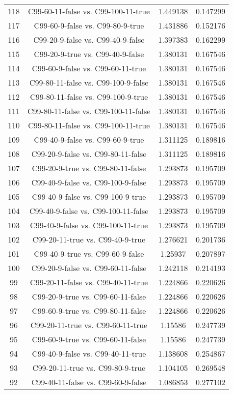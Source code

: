 \documentclass[a4paper,10pt]{article}
\begin{document}
\begin{landscape}
\begin{table}[!htp]
\begin{tabular}{cccc}
118&C99-60-11-false vs. C99-100-11-true&1.449138&0.147299\\
117&C99-60-9-false vs. C99-80-9-true&1.431886&0.152176\\
116&C99-20-9-false vs. C99-40-9-false&1.397383&0.162299\\
115&C99-20-9-true vs. C99-40-9-false&1.380131&0.167546\\
114&C99-60-9-false vs. C99-60-11-true&1.380131&0.167546\\
113&C99-80-11-false vs. C99-100-9-false&1.380131&0.167546\\
112&C99-80-11-false vs. C99-100-9-true&1.380131&0.167546\\
111&C99-80-11-false vs. C99-100-11-false&1.380131&0.167546\\
110&C99-80-11-false vs. C99-100-11-true&1.380131&0.167546\\
109&C99-40-9-false vs. C99-60-9-true&1.311125&0.189816\\
108&C99-20-9-false vs. C99-80-11-false&1.311125&0.189816\\
107&C99-20-9-true vs. C99-80-11-false&1.293873&0.195709\\
106&C99-40-9-false vs. C99-100-9-false&1.293873&0.195709\\
105&C99-40-9-false vs. C99-100-9-true&1.293873&0.195709\\
104&C99-40-9-false vs. C99-100-11-false&1.293873&0.195709\\
103&C99-40-9-false vs. C99-100-11-true&1.293873&0.195709\\
102&C99-20-11-true vs. C99-40-9-true&1.276621&0.201736\\
101&C99-40-9-true vs. C99-60-9-false&1.25937&0.207897\\
100&C99-20-9-false vs. C99-60-11-false&1.242118&0.214193\\
99&C99-20-11-false vs. C99-40-11-true&1.224866&0.220626\\
98&C99-20-9-true vs. C99-60-11-false&1.224866&0.220626\\
97&C99-60-9-true vs. C99-80-11-false&1.224866&0.220626\\
96&C99-20-11-true vs. C99-60-11-true&1.15586&0.247739\\
95&C99-60-9-true vs. C99-60-11-false&1.15586&0.247739\\
94&C99-40-9-false vs. C99-40-11-true&1.138608&0.254867\\
93&C99-20-11-true vs. C99-80-9-true&1.104105&0.269548\\
92&C99-40-11-false vs. C99-60-9-false&1.086853&0.277102\\

\end{tabular}
\end{table}
\end{landscape}
\end{document}
